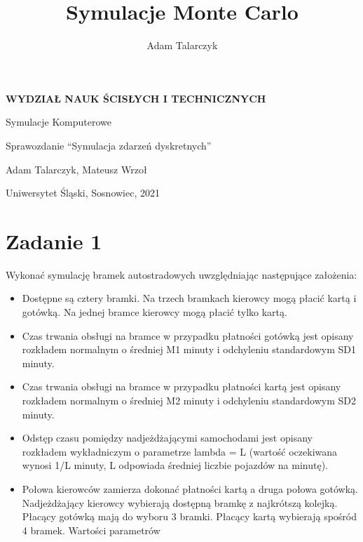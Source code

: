 \documentclass[a4paper,11pt,titlepage]{article}
\author{Adam Talarczyk}
\title{Symulacje Monte Carlo}
\begin{document}
\begin{titlepage}
    \begin{center}

        \Huge
        \textbf{WYDZIAŁ NAUK ŚCISŁYCH I TECHNICZNYCH}
        
        
        \vspace{1.5cm}
	   Symulacje Komputerowe
        \LARGE
        
	\vspace{2cm}
	
	Sprawozdanie ``Symulacja zdarzeń dyskretnych''

	\vspace{1cm}
	Adam Talarczyk, Mateusz Wrzoł
	
	\vspace{5cm}
        \vfill

        \vspace{0.8cm}
	\Large
        Uniwersytet Śląski, Sosnowiec, 2021

    \end{center}
\end{titlepage}
\newpage



\section{Zadanie 1}
Wykonać symulację bramek autostradowych uwzględniając następujące założenia:
\begin{itemize}
	\item Dostępne są cztery bramki. Na trzech bramkach kierowcy mogą płacić kartą i gotówką. Na jednej bramce kierowcy mogą płacić tylko kartą.
	\item Czas trwania obsługi na bramce w przypadku płatności gotówką jest opisany rozkładem normalnym o średniej M1 minuty i odchyleniu standardowym SD1 minuty.
	\item Czas trwania obsługi na bramce w przypadku płatności kartą jest opisany rozkładem normalnym o średniej M2 minuty i odchyleniu standardowym SD2 minuty.
	\item Odstęp czasu pomiędzy nadjeżdżającymi samochodami jest opisany rozkładem wykładniczym o parametrze lambda = L (wartość oczekiwana wynosi 1/L minuty, L odpowiada średniej liczbie pojazdów na minutę).
	\item Połowa kierowców zamierza dokonać płatności kartą a druga połowa gotówką. Nadjeżdżający kierowcy wybierają dostępną bramkę z najkrótszą kolejką. Płacący gotówką mają do wyboru 3 bramki. Płacący kartą wybierają spośród 4 bramek.
	Wartości parametrów
	\end{itemize}
\end{document}
